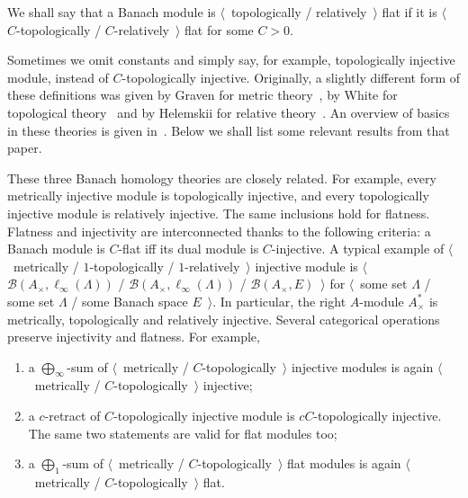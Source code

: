 \documentclass[12pt]{article}
\begin{document}
We shall say that a Banach module is $\langle$~topologically /
relatively~$\rangle$ flat if it is $\langle$~$C$-topologically /
$C$-relatively~$\rangle$ flat for some $C>0$.

Sometimes we omit constants and simply say, for example, topologically injective
module, instead of $C$-topologically injective. Originally, a slightly different
form of these definitions was given by Graven for metric
theory~\cite{GravInjProjBanMod}, by White for topological
theory~\cite{WhiteInjmoduAlg} and by Helemskii for relative
theory~\cite{HelemHomolDimNorModBanAlg}. An overview of basics in these theories
is given in~\cite{NemGeomProjInjFlatBanMod}. Below we shall list some relevant
results from that paper.

These three Banach homology theories are closely related. For example, every
metrically injective module is topologically injective, and every topologically
injective module is relatively injective. The same inclusions hold for flatness.
Flatness and injectivity are interconnected thanks to the following criteria: a
Banach module is $C$-flat iff its dual module is $C$-injective. A typical
example of $\langle$~metrically / $1$-topologically / $1$-relatively~$\rangle$
injective module is $\langle$~$\mathcal{B}(A_\times, \ell_\infty(\Lambda))$ /
$\mathcal{B}(A_\times, \ell_\infty(\Lambda))$ / $\mathcal{B}(A_\times,
E)$~$\rangle$ for $\langle$~some set $\Lambda$ / some set $\Lambda$ / some
Banach space $E$~$\rangle$. In particular, the right $A$-module $A_\times^*$ is
metrically, topologically and relatively injective. Several categorical
operations preserve injectivity and flatness. For example,
\begin{enumerate}[label = (\roman*)]
\item a $\bigoplus_\infty$-sum of $\langle$~metrically /
$C$-topologically~$\rangle$ injective modules is again $\langle$~metrically /
$C$-topologically~$\rangle$ injective;

\item a $c$-retract of $C$-topologically injective module is $cC$-topologically
injective. The same two statements are valid for flat modules too;

\item a $\bigoplus_1$-sum of $\langle$~metrically / $C$-topologically~$\rangle$
flat modules is again $\langle$~metrically / $C$-topologically~$\rangle$ flat.
\end{enumerate}
\end{document}
